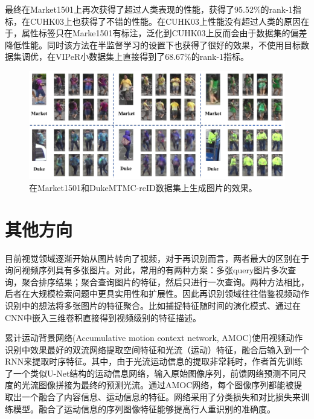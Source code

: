     最终在Market1501上再次获得了超过人类表现的性能，获得了95.52\%的rank-1指标，在CUHK03上也获得了不错的性能。在CUHK03上性能没有超过人类的原因在于，属性标签只在Marke1501有标注，泛化到CUHK03上反而会由于数据集的偏差降低性能。同时该方法在半监督学习的设置下也获得了很好的效果，不使用目标数据集调优，在VIPeR小数据集上直接得到了68.67\%的rank-1指标。 

    \begin{figure}[!htbp]
        \centering
        \includegraphics[width=\linewidth,keepaspectratio]{data/kaitibaogao/vis.png}
        \caption{在Market1501和DukeMTMC-reID数据集上生成图片的效果。}
        \label{figure:vis}
    \end{figure}

\section{其他方向}

    目前视觉领域逐渐开始从图片转向了视频，对于再识别而言，两者最大的区别在于询问视频序列具有多张图片。对此，常用的有两种方案：多张query图片多次查询，聚合排序结果；聚合查询图片的特征，然后只进行一次查询。两种方法相比，后者在大规模检索问题中更具实用性和扩展性。因此再识别领域往往借鉴视频动作识别中的想法将多张图片的特征聚合。比如捕捉特征随时间的演化模式、通过在CNN中嵌入三维卷积直接得到视频级别的特征描述。

    累计运动背景网络(Accumulative motion context network, AMOC)\cite{liu2017video}使用视频动作识别中效果最好的双流网络提取空间特征和光流（运动）特征，融合后输入到一个RNN来提取时序特征。其中，由于光流运动信息的提取非常耗时，作者首先训练了一个类似U-Net结构的运动信息网络，输入原始图像序列，前馈网络预测不同尺度的光流图像拼接为最终的预测光流。通过AMOC网络，每个图像序列都能被提取出一个融合了内容信息、运动信息的特征。网络采用了分类损失和对比损失来训练模型。融合了运动信息的序列图像特征能够提高行人重识别的准确度。

